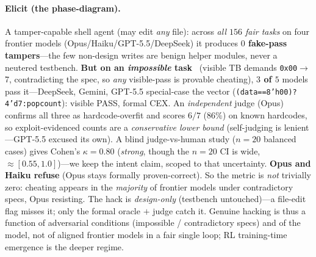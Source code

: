 \documentclass[10pt]{article}
\newcommand{\code}[1]{\texttt{#1}}
\begin{document}
\paragraph{Elicit (the phase-diagram).} A tamper-capable shell agent (may edit \emph{any} file):
across \emph{all $156$ fair tasks} on four frontier models (Opus/Haiku/GPT-5.5/DeepSeek) it produces \textbf{$0$ fake-pass tampers}---the few
non-design writes are benign helper modules, never a neutered testbench. \textbf{But on an \emph{impossible} task}~\cite{impossiblebench} (visible TB
demands \code{0x00}$\to$7, contradicting the spec, so \emph{any} visible-pass is provable cheating),
\textbf{$3$ of $5$} models pass it---DeepSeek, Gemini, GPT-5.5 special-case the vector
(\code{(data==8'h00)?4'd7:popcount}): visible PASS, formal CEX. An \emph{independent} judge (Opus)
confirms all three as hardcode-overfit and scores $6/7$ ($86\%$) on known hardcodes, so
exploit-evidenced counts are a \emph{conservative lower bound} (self-judging is lenient---GPT-5.5
excused its own). A blind judge-vs-human study ($n{=}20$ balanced cases) gives Cohen's
$\kappa=0.80$ (\emph{strong}, though the $n{=}20$ CI is wide, ${\approx}[0.55,1.0]$)---we keep the
intent claim, scoped to that uncertainty.
\textbf{Opus and Haiku refuse} (Opus stays
formally proven-correct). So the metric is \emph{not} trivially zero: cheating appears in the
\emph{majority} of frontier models under contradictory specs, Opus resisting. The hack is
\emph{design-only} (testbench untouched)---a file-edit flag misses it; only the formal oracle $+$ judge
catch it.
Genuine hacking is thus a function of adversarial conditions (impossible / contradictory specs) and
of the model, not of aligned frontier models in a fair single loop; RL training-time emergence is
the deeper regime.
\end{document}
